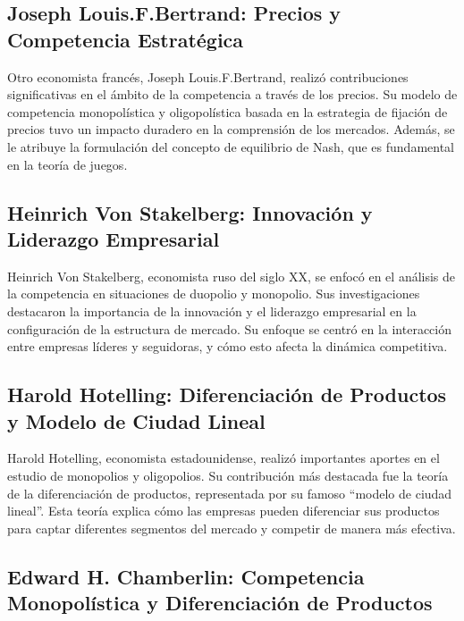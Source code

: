 \documentclass[
  doc,
  floatsintext,
  longtable,
  a4paper,
  nolmodern,
  notxfonts,
  notimes,
  colorlinks=true,linkcolor=blue,citecolor=blue,urlcolor=blue]{apa7}
\begin{document}
\subsection{Joseph Louis.F.Bertrand: Precios y Competencia
Estratégica}\label{joseph-louis.f.bertrand-precios-y-competencia-estratuxe9gica}

Otro economista francés, Joseph Louis.F.Bertrand, realizó contribuciones
significativas en el ámbito de la competencia a través de los precios.
Su modelo de competencia monopolística y oligopolística basada en la
estrategia de fijación de precios tuvo un impacto duradero en la
comprensión de los mercados. Además, se le atribuye la formulación del
concepto de equilibrio de Nash, que es fundamental en la teoría de
juegos.

\subsection{Heinrich Von Stakelberg: Innovación y Liderazgo
Empresarial}\label{heinrich-von-stakelberg-innovaciuxf3n-y-liderazgo-empresarial}

Heinrich Von Stakelberg, economista ruso del siglo XX, se enfocó en el
análisis de la competencia en situaciones de duopolio y monopolio. Sus
investigaciones destacaron la importancia de la innovación y el
liderazgo empresarial en la configuración de la estructura de mercado.
Su enfoque se centró en la interacción entre empresas líderes y
seguidoras, y cómo esto afecta la dinámica competitiva.

\subsection{Harold Hotelling: Diferenciación de Productos y Modelo de
Ciudad
Lineal}\label{harold-hotelling-diferenciaciuxf3n-de-productos-y-modelo-de-ciudad-lineal}

Harold Hotelling, economista estadounidense, realizó importantes aportes
en el estudio de monopolios y oligopolios. Su contribución más destacada
fue la teoría de la diferenciación de productos, representada por su
famoso ``modelo de ciudad lineal''. Esta teoría explica cómo las
empresas pueden diferenciar sus productos para captar diferentes
segmentos del mercado y competir de manera más efectiva.

\subsection{Edward H. Chamberlin: Competencia Monopolística y
Diferenciación de
Productos}\label{edward-h.-chamberlin-competencia-monopoluxedstica-y-diferenciaciuxf3n-de-productos}
\end{document}
